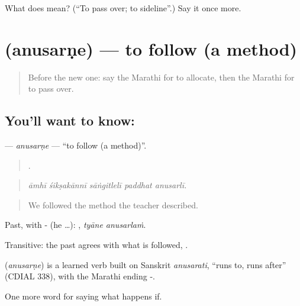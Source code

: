 \begin{tcolorbox}[breakable,colback=teal!4,colframe=teal!35!black,title={Before you move on}]
What does  mean? (\textquotedblleft{}To pass over; to sideline\textquotedblright{}.) Say it once more.
\end{tcolorbox}
\section[\texorpdfstring{\mr{अनुसरणे} (anusarṇe)}{अनुसरणे (anusarṇe)}]{ (anusarṇe) — to follow (a method)}

\label{lesson:MR-C392-anusarne}



\begin{quote}
Before the new one: say the Marathi for to allocate, then the Marathi for to pass over.
\end{quote}

\subsection*{You'll want to know: }
\textbf{} — \emph{anusarṇe} — \textquotedblleft{}to follow (a method)\textquotedblright{}.

\begin{quote}
    .
\end{quote}

\begin{quote}
\emph{āmhī śikṣakānnī sāṅgitlelī paddhat anusarlī.}
\end{quote}

\begin{quote}
We followed the method the teacher described.
\end{quote}

Past, with - (he …):  , \emph{tyāne anusarlaṁ}.

Transitive: the past agrees with what is followed,  .

\begin{cousinweb}
\textbf{} (\emph{anusarṇe}) is a learned verb built on Sanskrit \emph{anusarati}, \textquotedblleft{}runs to, runs after\textquotedblright{} (CDIAL 338), with the Marathi ending -.
\end{cousinweb}

\begin{grammarlens}[title={What you've built}]
One more word for saying what happens if.
\end{grammarlens}


